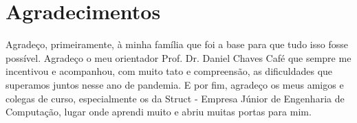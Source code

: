 \chapter*{Agradecimentos}

Agradeço, primeiramente, à minha família que foi a base para que tudo isso fosse possível. Agradeço o meu orientador Prof. Dr. Daniel Chaves Café que sempre me incentivou e acompanhou, com muito tato e compreensão, as dificuldades que superamos juntos nesse ano de pandemia. E por fim, agradeço os meus amigos e colegas de curso, especialmente os da Struct - Empresa Júnior de Engenharia de Computação, lugar onde aprendi muito e abriu muitas portas para mim. 